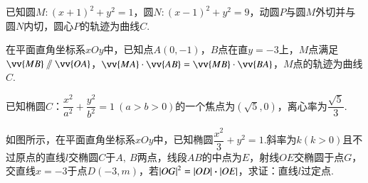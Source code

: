 \documentclass{BHCexam}
\begin{document}
\begin{questions}
\kongbai
\qs 已知圆$M:(x+1)^2+y^2=1$，圆$N:(x-1)^2+y^2=9$，动圆$P$与圆$M$外切并与圆$N$内切，圆心$P$的轨迹为曲线$C$.
\kongbai
\qs 
在平面直角坐标系$xOy$中，已知点$A(0,-1)$，$B$点在直$y=-3$上，$M$点满足$\vv{MB}\sslash\vv{OA}$，$\vv{MA}\cdot\vv{AB}=\vv{MB}\cdot\vv{BA}$，$M$点的轨迹为曲线$C$.
\kongbai
\qs 已知椭圆$C$：$\dfrac{x^2}{a^2}+\dfrac{y^2}{b^2}=1~(a>b>0)$的一个焦点为$ (\sqrt{5},0) $，离心率为$ \dfrac{\sqrt{5}}{3} $.
\kongbai 
\qs 如图所示，在平面直角坐标系$ xOy $中，已知椭圆$ \dfrac{x^2}{3}+y^2=1. $斜率为$ k (k>0)$且不过原点的直线$ l $交椭圆$ C $于$A,~B  $两点，线段$ AB $的中点为$ E $，射线$ OE $交椭圆于点$ G $，交直线$ x=-3 $于点$ D(-3,m) $，若$\left|OG\right|^2=\left|OD\right|\bm{\cdot}\left|OE\right| $，求证：直线$ l $过定点.


\end{questions}
\end{document}
